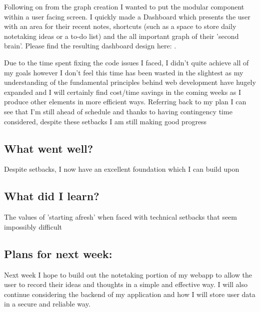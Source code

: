 Following on from the graph creation I wanted to put the modular component within a user facing screen. I quickly made a Dashboard which presents the user with an area for their recent notes, shortcuts (such as a space to store daily notetaking ideas or a to-do list) and the all important graph of their 'second brain'. Please find the resulting dashboard design here: .

Due to the time spent fixing the code issues I faced, I didn't quite achieve  all of my goals however I don't feel this time has been wasted in the slightest as my understanding of the fundamental principles behind web development have hugely expanded and I will certainly find cost/time savings in the coming weeks as I produce other elements in more efficient ways. Referring back to my plan I can see that I'm still ahead of schedule and thanks to having contingency time considered, despite these setbacks I am still making good progress

\subsection*{What went well?}
Despite setbacks, I now have an excellent foundation which I can build upon
\subsection*{What did I learn?}
The values of 'starting afresh' when faced with technical setbacks that seem impossibly difficult

\subsection*{Plans for next week:}
Next week I hope to build out the notetaking portion of my webapp to allow the user to record their ideas and thoughts in a simple and effective way. I will also continue considering the backend of my application and how I will store user data in a secure and reliable way.
